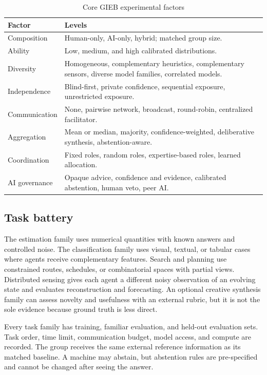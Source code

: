 \documentclass[conference]{IEEEtran}
\begin{document}
\begin{table}[t]
\caption{Core GIEB experimental factors}
\label{tab:factors}
\centering
\scriptsize
\begin{tabular}{p{}p{}}
\toprule
Factor & Levels\\
\midrule
Composition & Human-only, AI-only, hybrid; matched group size.\\
Ability & Low, medium, and high calibrated distributions.\\
Diversity & Homogeneous, complementary heuristics, complementary sensors, diverse model families, correlated models.\\
Independence & Blind-first, private confidence, sequential exposure, unrestricted exposure.\\
Communication & None, pairwise network, broadcast, round-robin, centralized facilitator.\\
Aggregation & Mean or median, majority, confidence-weighted, deliberative synthesis, abstention-aware.\\
Coordination & Fixed roles, random roles, expertise-based roles, learned allocation.\\
AI governance & Opaque advice, confidence and evidence, calibrated abstention, human veto, peer AI.\\
\bottomrule
\end{tabular}
\end{table}

\subsection{Task battery}

The estimation family uses numerical quantities with known answers and controlled noise. The classification family uses visual, textual, or tabular cases where agents receive complementary features. Search and planning use constrained routes, schedules, or combinatorial spaces with partial views. Distributed sensing gives each agent a different noisy observation of an evolving state and evaluates reconstruction and forecasting. An optional creative synthesis family can assess novelty and usefulness with an external rubric, but it is not the sole evidence because ground truth is less direct.

Every task family has training, familiar evaluation, and held-out evaluation sets. Task order, time limit, communication budget, model access, and compute are recorded. The group receives the same external reference information as its matched baseline. A machine may abstain, but abstention rules are pre-specified and cannot be changed after seeing the answer.
\end{document}
